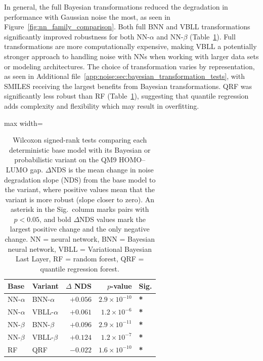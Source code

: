 In general, the full Bayesian transformations reduced the degradation in performance with Gaussian noise the most, as seen in Figure~\ref{fig:nn_family_comparison}. Both full BNN and VBLL transformations significantly improved robustness for both NN-$\alpha$ and NN-$\beta$ (Table~\ref{tab:wilcoxon_bnn}). Full transformations are more computationally expensive, making VBLL a potentially stronger approach to handling noise with NNs when working with larger data sets or modeling architectures. The choice of transformation varies by representation, as seen in Additional file~\ref{app:noise:sec:bayesian_transformation_tests}, with SMILES receiving the largest benefits from Bayesian transformations. QRF was significantly less robust than RF (Table~\ref{tab:wilcoxon_bnn}), suggesting that quantile regression adds complexity and flexibility which may result in overfitting.

\begin{table}[htbp]
\centering
\caption[Wilcoxon signed-rank tests of probabilistic variants on QM9.]{Wilcoxon signed-rank tests comparing each deterministic base model with its Bayesian or probabilistic variant on the QM9 HOMO--LUMO gap. $\Delta$NDS is the mean change in noise degradation slope (NDS) from the base model to the variant, where positive values mean that the variant is more robust (slope closer to zero). An asterisk in the Sig.\ column marks pairs with $p < 0.05$, and bold $\Delta$NDS values mark the largest positive change and the only negative change. NN = neural network, BNN = Bayesian neural network, VBLL = Variational Bayesian Last Layer, RF = random forest, QRF = quantile regression forest.}
\label{tab:wilcoxon_bnn}
\small
\begin{adjustbox}{max width=\textwidth}
\begin{tabular}{llrrl}
\toprule
\textbf{Base} & \textbf{Variant} & \textbf{$\Delta$ NDS} & \textbf{$p$-value} & \textbf{Sig.} \\
\midrule
NN-$\alpha$ & BNN-$\alpha$ & $+0.056$ & $2.9 \times 10^{-10}$ & \textbf{*} \\
NN-$\alpha$ & VBLL-$\alpha$ & $+0.061$ & $1.2 \times 10^{-6}$ & \textbf{*} \\
NN-$\beta$ & BNN-$\beta$ & $+0.096$ & $2.9 \times 10^{-11}$ & \textbf{*} \\
NN-$\beta$ & VBLL-$\beta$ & $\mathbf{+0.124}$ & $1.2 \times 10^{-7}$ & \textbf{*} \\
RF  & QRF  & $\mathbf{-0.022}$ & $1.6 \times 10^{-10}$ & \textbf{*} \\
\bottomrule
\end{tabular}
\end{adjustbox}
\end{table}

